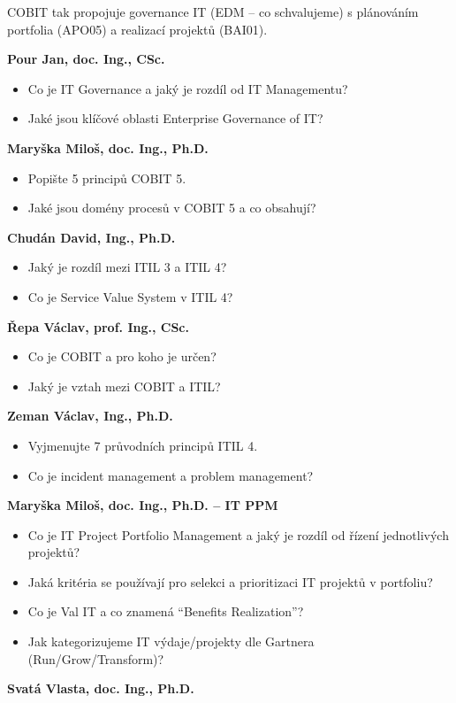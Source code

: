 COBIT tak propojuje governance IT (EDM -- co schvalujeme) s plánováním portfolia (APO05)
a realizací projektů (BAI01).

\begin{profesorbox}
\textbf{Pour Jan, doc. Ing., CSc.}
\begin{itemize}
  \item Co je IT Governance a jaký je rozdíl od IT Managementu?
  \item Jaké jsou klíčové oblasti Enterprise Governance of IT?
\end{itemize}
\textbf{Maryška Miloš, doc. Ing., Ph.D.}
\begin{itemize}
  \item Popište 5 principů COBIT 5.
  \item Jaké jsou domény procesů v COBIT 5 a co obsahují?
\end{itemize}
\textbf{Chudán David, Ing., Ph.D.}
\begin{itemize}
  \item Jaký je rozdíl mezi ITIL 3 a ITIL 4?
  \item Co je Service Value System v ITIL 4?
\end{itemize}
\textbf{Řepa Václav, prof. Ing., CSc.}
\begin{itemize}
  \item Co je COBIT a pro koho je určen?
  \item Jaký je vztah mezi COBIT a ITIL?
\end{itemize}
\textbf{Zeman Václav, Ing., Ph.D.}
\begin{itemize}
  \item Vyjmenujte 7 průvodních principů ITIL 4.
  \item Co je incident management a problem management?
\end{itemize}
\textbf{Maryška Miloš, doc. Ing., Ph.D. -- IT PPM}
\begin{itemize}
  \item Co je IT Project Portfolio Management a jaký je rozdíl od řízení jednotlivých projektů?
  \item Jaká kritéria se používají pro selekci a prioritizaci IT projektů v portfoliu?
  \item Co je Val IT a co znamená ``Benefits Realization''?
  \item Jak kategorizujeme IT výdaje/projekty dle Gartnera (Run/Grow/Transform)?
\end{itemize}
\textbf{Svatá Vlasta, doc. Ing., Ph.D.}
\begin{itemize}

\end{itemize}
\end{profesorbox}
